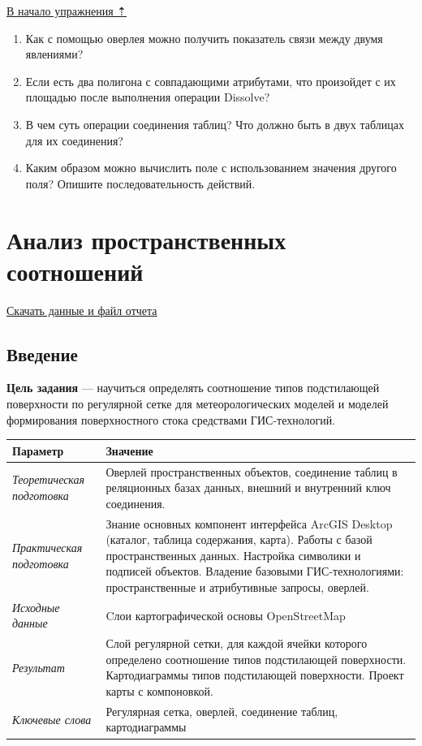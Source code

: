 \documentclass[12pt,]{book}
\begin{document}
\protect\hyperlink{overlay}{В начало упражнения ⇡}

\begin{enumerate}
\def\labelenumi{\arabic{enumi}.}
\item
  Как с помощью оверлея можно получить показатель связи между двумя явлениями?
\item
  Если есть два полигона с совпадающими атрибутами, что произойдет с их площадью после выполнения операции Dissolve?
\item
  В чем суть операции соединения таблиц? Что должно быть в двух таблицах для их соединения?
\item
  Каким образом можно вычислить поле с использованием значения другого поля? Опишите последовательность действий.
\end{enumerate}

\hypertarget{land-cover-hydro}{%
\chapter{Анализ пространственных соотношений}\label{land-cover-hydro}}

\href{http://autolab.geogr.msu.ru/gis/data/Ex11.zip}{Скачать данные и файл отчета}

\hypertarget{land-cover-hydro-intro}{%
\section{Введение}\label{land-cover-hydro-intro}}

\textbf{Цель задания} --- научиться определять соотношение типов подстилающей поверхности по регулярной сетке для метеорологических моделей и моделей формирования поверхностного стока средствами ГИС-технологий.

\begin{longtable}[]{@{}ll@{}}
\toprule
Параметр & Значение\tabularnewline
\midrule
\endhead
\emph{Теоретическая подготовка} & Оверлей пространственных объектов, соединение таблиц в реляционных базах данных, внешний и внутренний ключ соединения.\tabularnewline
\emph{Практическая подготовка} & Знание основных компонент интерфейса ArcGIS Desktop (каталог, таблица содержания, карта). Работы с базой пространственных данных. Настройка символики и подписей объектов. Владение базовыми ГИС-технологиями: пространственные и атрибутивные запросы, оверлей.\tabularnewline
\emph{Исходные данные} & Cлои картографической основы OpenStreetMap\tabularnewline
\emph{Результат} & Слой регулярной сетки, для каждой ячейки которого определено соотношение типов подстилающей поверхности. Картодиаграммы типов подстилающей поверхности. Проект карты с компоновкой.\tabularnewline
\emph{Ключевые слова} & Регулярная сетка, оверлей, соединение таблиц, картодиаграммы\tabularnewline
\bottomrule
\end{longtable}
\end{document}
